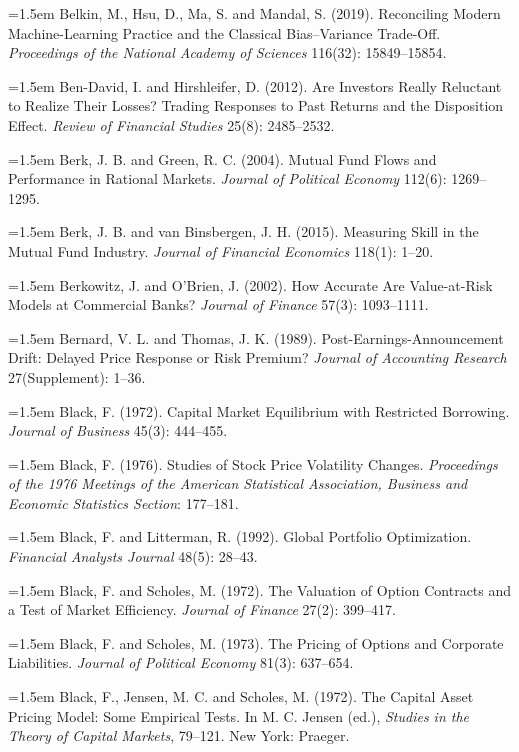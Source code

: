 \hangindent=1.5em Belkin, M., Hsu, D., Ma, S. and Mandal, S. (2019). Reconciling Modern Machine-Learning Practice and the Classical Bias--Variance Trade-Off. \emph{Proceedings of the National Academy of Sciences} 116(32): 15849--15854.

\hangindent=1.5em Ben-David, I. and Hirshleifer, D. (2012). Are Investors Really Reluctant to Realize Their Losses? Trading Responses to Past Returns and the Disposition Effect. \emph{Review of Financial Studies} 25(8): 2485--2532.

\hangindent=1.5em Berk, J. B. and Green, R. C. (2004). Mutual Fund Flows and Performance in Rational Markets. \emph{Journal of Political Economy} 112(6): 1269--1295.

\hangindent=1.5em Berk, J. B. and van Binsbergen, J. H. (2015). Measuring Skill in the Mutual Fund Industry. \emph{Journal of Financial Economics} 118(1): 1--20.

\hangindent=1.5em Berkowitz, J. and O'Brien, J. (2002). How Accurate Are Value-at-Risk Models at Commercial Banks? \emph{Journal of Finance} 57(3): 1093--1111.

\hangindent=1.5em Bernard, V. L. and Thomas, J. K. (1989). Post-Earnings-Announcement Drift: Delayed Price Response or Risk Premium? \emph{Journal of Accounting Research} 27(Supplement): 1--36.

\hangindent=1.5em Black, F. (1972). Capital Market Equilibrium with Restricted Borrowing. \emph{Journal of Business} 45(3): 444--455.

\hangindent=1.5em Black, F. (1976). Studies of Stock Price Volatility Changes. \emph{Proceedings of the 1976 Meetings of the American Statistical Association, Business and Economic Statistics Section}: 177--181.

\hangindent=1.5em Black, F. and Litterman, R. (1992). Global Portfolio Optimization. \emph{Financial Analysts Journal} 48(5): 28--43.

\hangindent=1.5em Black, F. and Scholes, M. (1972). The Valuation of Option Contracts and a Test of Market Efficiency. \emph{Journal of Finance} 27(2): 399--417.

\hangindent=1.5em Black, F. and Scholes, M. (1973). The Pricing of Options and Corporate Liabilities. \emph{Journal of Political Economy} 81(3): 637--654.

\hangindent=1.5em Black, F., Jensen, M. C. and Scholes, M. (1972). The Capital Asset Pricing Model: Some Empirical Tests. In M. C. Jensen (ed.), \emph{Studies in the Theory of Capital Markets}, 79--121. New York: Praeger.

